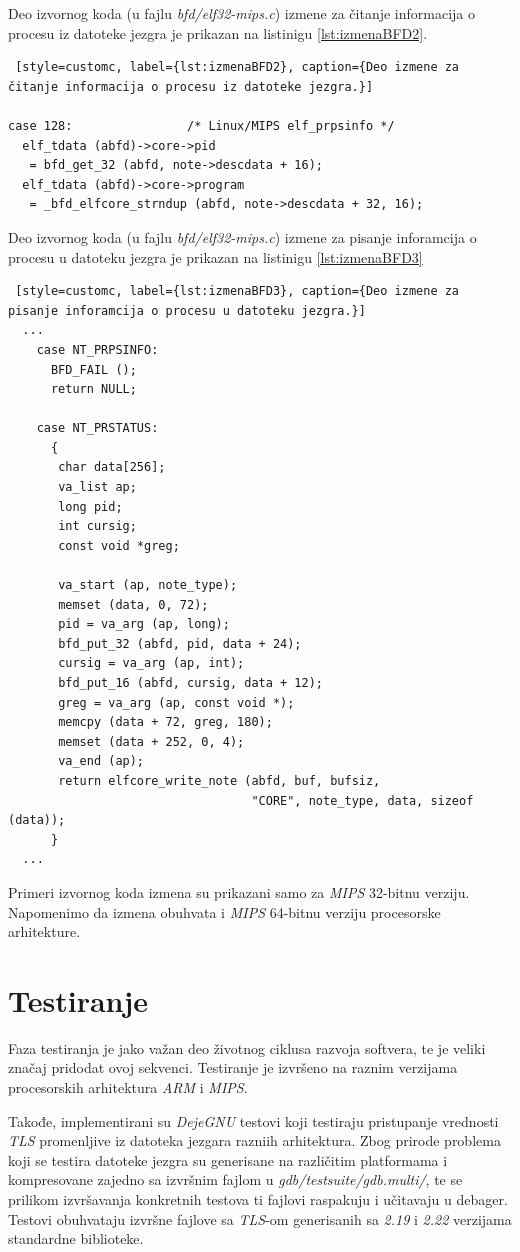 \documentclass[12pt,oneside]{memoir}
\begin{document}
Deo izvornog koda (u fajlu \emph{bfd/elf32-mips.c}) izmene za čitanje informacija o procesu iz datoteke jezgra je prikazan na listinigu \ref{lst:izmenaBFD2}.
\begin{lstlisting} [style=customc, label={lst:izmenaBFD2}, caption={Deo izmene za čitanje informacija o procesu iz datoteke jezgra.}]

case 128:                /* Linux/MIPS elf_prpsinfo */
  elf_tdata (abfd)->core->pid
   = bfd_get_32 (abfd, note->descdata + 16);
  elf_tdata (abfd)->core->program
   = _bfd_elfcore_strndup (abfd, note->descdata + 32, 16);
\end{lstlisting}\newpage
Deo izvornog koda (u fajlu \emph{bfd/elf32-mips.c}) izmene za pisanje inforamcija o procesu u datoteku jezgra je prikazan na listinigu \ref{lst:izmenaBFD3}
\begin{lstlisting} [style=customc, label={lst:izmenaBFD3}, caption={Deo izmene za pisanje inforamcija o procesu u datoteku jezgra.}]
  ...
    case NT_PRPSINFO:
      BFD_FAIL ();
      return NULL;

    case NT_PRSTATUS:
      {
       char data[256];
       va_list ap;
       long pid;
       int cursig;
       const void *greg;

       va_start (ap, note_type);
       memset (data, 0, 72);
       pid = va_arg (ap, long);
       bfd_put_32 (abfd, pid, data + 24);
       cursig = va_arg (ap, int);
       bfd_put_16 (abfd, cursig, data + 12);
       greg = va_arg (ap, const void *);
       memcpy (data + 72, greg, 180);
       memset (data + 252, 0, 4);
       va_end (ap);
       return elfcore_write_note (abfd, buf, bufsiz,
                                  "CORE", note_type, data, sizeof (data));
      }
  ...
\end{lstlisting}

Primeri izvornog koda izmena su prikazani samo za \emph{MIPS} 32-bitnu verziju. Napomenimo da izmena obuhvata i \emph{MIPS} 64-bitnu verziju procesorske arhitekture.

\section{Testiranje}

Faza testiranja je jako važan deo životnog ciklusa razvoja softvera, te je veliki značaj pridodat ovoj sekvenci. Testiranje je izvršeno na raznim verzijama procesorskih arhitektura \emph{ARM} i \emph{MIPS}.

Takođe, implementirani su \emph{DejeGNU} \cite{DejaGNU} testovi koji testiraju pristupanje vrednosti \emph{TLS} promenljive iz datoteka jezgara razniih arhitektura. Zbog prirode problema koji se testira datoteke jezgra su generisane na različitim platformama i kompresovane zajedno sa izvršnim fajlom u \emph{gdb/testsuite/gdb.multi/}, te se prilikom izvršavanja konkretnih testova ti fajlovi raspakuju i učitavaju u debager. Testovi obuhvataju izvršne fajlove sa \emph{TLS}-om generisanih sa \emph{2.19} i \emph{2.22} verzijama standardne biblioteke.
\end{document}
